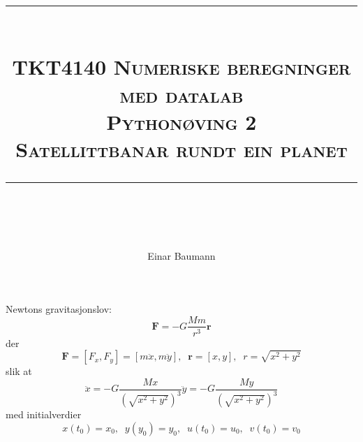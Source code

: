 




\author{Einar Baumann}
\title{
    \vspace{-1in}
    \vspace{0.1in}
    \rule{\textwidth}{0.5pt} \\[0.5cm]
    \normalfont \normalsize \textsc{TKT4140 Numeriske beregninger med datalab} \\ [20pt]
    {\textsc{ \huge Pythonøving 2}} \\ [0.5cm]
    {\textsc {\Large Satellittbanar rundt ein planet} } \\
    \vspace{0.1in}
    \rule{\textwidth}{2pt} \\[0.7cm]
}


\maketitle
\thispagestyle{empty}
\clearpage

\noindent Newtons gravitasjonslov:
\begin{equation}
  \mathbf{F} = -G \frac{Mm}{r^3} \mathbf{r}
\end{equation}
der
\begin{equation}
  \nonumber
  \mathbf{F} = [F_x,F_y] = [m\ddot x,m\ddot y], \;\; \mathbf{r}=[x,y], \;\; r = \sqrt{x^2+y^2}
\end{equation}
slik at
\begin{subequations}
\begin{equation}
  \ddot x = -G \frac{Mx}{\left( \sqrt{x^2+y^2} \right)^3} \label{eq:grav_x}
\end{equation}
\begin{equation}
  \ddot y = -G \frac{My}{\left( \sqrt{x^2+y^2} \right)^3} \label{eq:grav_y}
\end{equation}
\end{subequations}
med initialverdier
\begin{equation}
  \tag{init}
  x(t_0) = x_0, \;\; y(y_0) = y_0, \;\; u(t_0) = u_0, \;\; v(t_0) = v_0
\end{equation}

